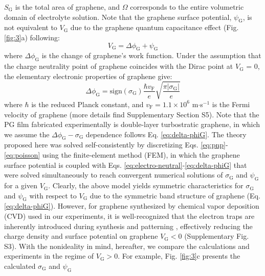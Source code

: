 \documentclass[journal=langd5,email=true, hyperref=true, keywords=false]{achemso}
\newcommand{\Fig}{Fig.}
\begin{document}
$S_{\mathrm{G}}$ is the total area of graphene, and $\Omega$
corresponds to the entire volumetric domain of electrolyte
solution. Note that the graphene surface potential,
$\psi_{\mathrm{G}}$, is not equivalent to $V_{\mathrm{G}}$ due to the
graphene quantum capacitance effect\cite{Xia_2009} (\Fig{}
\ref{fig:3}a) following:
\begin{equation}
  \label{eq:Vg}
  V_{\mathrm{G}} = \Delta \phi_{\mathrm{G}} + \psi_{\mathrm{G}}
\end{equation}
where $\Delta \phi_{\mathrm{G}}$ is the change of graphene’s work
function. Under the assumption that the charge neutrality point of
graphene coincides with the Dirac point at $V_{\mathrm{G}}$ = 0, the elementary
electronic properties of graphene give:
\begin{equation}
  \label{eq:delta-phiG}
  \Delta \phi_{\mathrm{G}} = \mathrm{sign}(\sigma_{\mathrm{G}}) \frac{\hbar v_{\mathrm{F}}}{e}
  \sqrt{\frac{\pi |\sigma_{\mathrm{G}}|}{e}}
\end{equation}
where $\hbar$ is the reduced Planck constant, and
$v_{\mathrm{F}}=1.1\times10^{6}$ m$\cdot$s$^{-1}$ is the Fermi
velocity of graphene (more details find Supplementary Section
S5). Note that the PG film fabricated experimentally is double-layer
turbostratic graphene, in which we assume the
$\Delta \phi_{\mathrm{G}} - \sigma_{\mathrm{G}}$ dependence follows
Eq. \eqref{eq:delta-phiG}. The theory proposed here was solved
self-consistently by discretizing Eqs. \eqref{eq:pnp}-\eqref{eq:poisson}
using the finite-element method (FEM), in which the graphene surface
potential is coupled with
Eqs. \eqref{eq:electro-neutral}-\eqref{eq:delta-phiG} that were solved
simultaneously to reach convergent numerical solutions of
$\sigma_{\mathrm{G}}$ and $\psi_{\mathrm{G}}$ for a given
$V_{\mathrm{G}}$. Clearly, the above model yields symmetric
characteristics for $\sigma_{\mathrm{G}}$ and $\psi_{\mathrm{G}}$ with
respect to $V_{\mathrm{G}}$ due to the symmetric band structure of
graphene (Eq. \eqref{eq:delta-phiG}). However, for graphene synthesized
by chemical vapor deposition (CVD) used in our experiments, it is
well-recognized that the electron traps are inherently introduced
during synthesis and patterning \cite{Dean_2010}, effectively reducing
the charge density and surface potential on graphene
$V_{\mathrm{G}}<0$ (Supplementary \Fig{} S3). With the nonideality in
mind, hereafter, we compare the calculations and experiments in the
regime of $V_{\mathrm{G}}>0$. For example, \Fig{} \ref{fig:3}c
presents the calculated $\sigma_{\mathrm{G}}$ and $\psi_{\mathrm{G}}$
\end{document}
